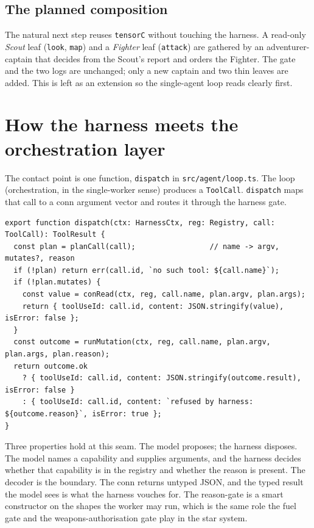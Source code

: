\documentclass[11pt]{article}
\newcommand{\code}[1]{\texttt{#1}}
\begin{document}
\subsection{The planned composition}

The natural next step reuses \code{tensorC} without touching the harness. A
read-only \emph{Scout} leaf (\code{look}, \code{map}) and a \emph{Fighter} leaf
(\code{attack}) are gathered by an adventurer-captain that decides from the
Scout's report and orders the Fighter. The gate and the two logs are unchanged;
only a new captain and two thin leaves are added. This is left as an extension so
the single-agent loop reads clearly first.

\section{How the harness meets the orchestration layer}

The contact point is one function, \code{dispatch} in \code{src/agent/loop.ts}.
The loop (orchestration, in the single-worker sense) produces a \code{ToolCall}.
\code{dispatch} maps that call to a conn argument vector and routes it through the
harness gate.

\begin{lstlisting}[language=TS]
export function dispatch(ctx: HarnessCtx, reg: Registry, call: ToolCall): ToolResult {
  const plan = planCall(call);                 // name -> argv, mutates?, reason
  if (!plan) return err(call.id, `no such tool: ${call.name}`);
  if (!plan.mutates) {
    const value = conRead(ctx, reg, call.name, plan.argv, plan.args);
    return { toolUseId: call.id, content: JSON.stringify(value), isError: false };
  }
  const outcome = runMutation(ctx, reg, call.name, plan.argv, plan.args, plan.reason);
  return outcome.ok
    ? { toolUseId: call.id, content: JSON.stringify(outcome.result), isError: false }
    : { toolUseId: call.id, content: `refused by harness: ${outcome.reason}`, isError: true };
}
\end{lstlisting}

Three properties hold at this seam. The model proposes; the harness disposes. The
model names a capability and supplies arguments, and the harness decides whether
that capability is in the registry and whether the reason is present. The decoder
is the boundary. The conn returns untyped JSON, and the typed result the model
sees is what the harness vouches for. The reason-gate is a smart constructor on
the shapes the worker may run, which is the same role the fuel gate and the
weapons-authorisation gate play in the star system.
\end{document}
